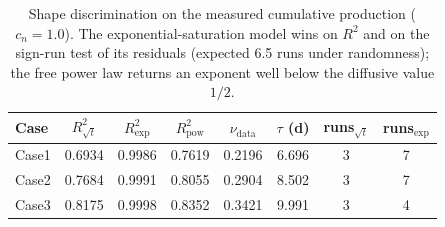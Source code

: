\begin{table}[htbp]
\centering
\caption{Shape discrimination on the measured cumulative production ($c_n=1.0$). The exponential-saturation model wins on $R^2$ and on the sign-run test of its residuals (expected 6.5 runs under randomness); the free power law returns an exponent well below the diffusive value $1/2$.}
\label{tab:shape}
\small
\begin{tabular}{@{}lccccccc@{}}
\toprule
Case & $R^2_{\sqrt{t}}$ & $R^2_{\exp}$ & $R^2_{\mathrm{pow}}$ & $\nu_{\mathrm{data}}$ & $\tau$ (d) & runs$_{\sqrt{t}}$ & runs$_{\exp}$ \\
\midrule
Case1 & 0.6934 & 0.9986 & 0.7619 & 0.2196 & 6.696 & 3 & 7 \\
Case2 & 0.7684 & 0.9991 & 0.8055 & 0.2904 & 8.502 & 3 & 7 \\
Case3 & 0.8175 & 0.9998 & 0.8352 & 0.3421 & 9.991 & 3 & 4 \\
\bottomrule
\end{tabular}
\end{table}
